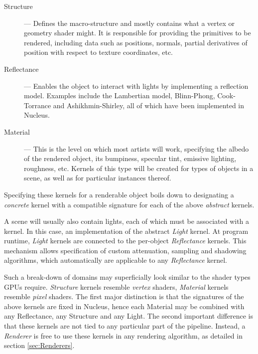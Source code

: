 \begin{description}
\item[Structure] --- Defines the macro-structure and mostly contains what a vertex or geometry shader might. It is responsible for providing the primitives to be rendered, including data such as positions, normals, partial derivatives of position with respect to texture coordinates, etc.

\item[Reflectance] --- Enables the object to interact with lights by implementing a reflection model. Examples include the Lambertian model, Blinn-Phong, Cook-Torrance and Ashikhmin-Shirley, all of which have been implemented in Nucleus.

\item[Material] --- This is the level on which most artists will work, specifying the albedo of the rendered object, its bumpiness, specular tint, emissive lighting, roughness, etc. Kernels of this type will be created for types of objects in a scene, as well as for particular instances thereof.
\end{description}

Specifying these kernels for a renderable object boils down to designating a \emph{concrete} kernel with a compatible signature for each of the above \emph{abstract} kernels.

A scene will usually also contain lights, each of which must be associated with a kernel. In this case, an implementation of the abstract \emph{Light} kernel. At program runtime, \emph{Light} kernels are connected to the per-object \emph{Reflectance} kernels. This mechanism allows specification of custom attenuation, sampling and shadowing algorithms, which automatically are applicable to any \emph{Reflectance} kernel.


Such a break-down of domains may superficially look similar to the shader types GPUs require. \emph{Structure} kernels resemble \emph{vertex} shaders, \emph{Material} kernels resemble \emph{pixel} shaders. The first major distinction is that the signatures of the above kernels are fixed in Nucleus, hence each Material may be combined with any Reflectance, any Structure and any Light. The second important difference is that these kernels are not tied to any particular part of the pipeline. Instead, a \emph{Renderer} is free to use these kernels in any rendering algorithm, as detailed in section \ref{sec:Renderers}.

